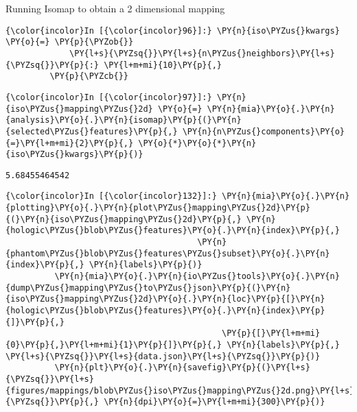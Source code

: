 Running Isomap to obtain a 2 dimensional mapping

    \begin{Verbatim}[commandchars=\\\{\}]
{\color{incolor}In [{\color{incolor}96}]:} \PY{n}{iso\PYZus{}kwargs} \PY{o}{=} \PY{p}{\PYZob{}}
             \PY{l+s}{\PYZsq{}}\PY{l+s}{n\PYZus{}neighbors}\PY{l+s}{\PYZsq{}}\PY{p}{:} \PY{l+m+mi}{10}\PY{p}{,}
         \PY{p}{\PYZcb{}}
\end{Verbatim}

    \begin{Verbatim}[commandchars=\\\{\}]
{\color{incolor}In [{\color{incolor}97}]:} \PY{n}{iso\PYZus{}mapping\PYZus{}2d} \PY{o}{=} \PY{n}{mia}\PY{o}{.}\PY{n}{analysis}\PY{o}{.}\PY{n}{isomap}\PY{p}{(}\PY{n}{selected\PYZus{}features}\PY{p}{,} \PY{n}{n\PYZus{}components}\PY{o}{=}\PY{l+m+mi}{2}\PY{p}{,} \PY{o}{*}\PY{o}{*}\PY{n}{iso\PYZus{}kwargs}\PY{p}{)}
\end{Verbatim}

    \begin{Verbatim}[commandchars=\\\{\}]
5.68455464542
    \end{Verbatim}

    \begin{Verbatim}[commandchars=\\\{\}]
{\color{incolor}In [{\color{incolor}132}]:} \PY{n}{mia}\PY{o}{.}\PY{n}{plotting}\PY{o}{.}\PY{n}{plot\PYZus{}mapping\PYZus{}2d}\PY{p}{(}\PY{n}{iso\PYZus{}mapping\PYZus{}2d}\PY{p}{,} \PY{n}{hologic\PYZus{}blob\PYZus{}features}\PY{o}{.}\PY{n}{index}\PY{p}{,}
                                       \PY{n}{phantom\PYZus{}blob\PYZus{}features\PYZus{}subset}\PY{o}{.}\PY{n}{index}\PY{p}{,} \PY{n}{labels}\PY{p}{)}
          \PY{n}{mia}\PY{o}{.}\PY{n}{io\PYZus{}tools}\PY{o}{.}\PY{n}{dump\PYZus{}mapping\PYZus{}to\PYZus{}json}\PY{p}{(}\PY{n}{iso\PYZus{}mapping\PYZus{}2d}\PY{o}{.}\PY{n}{loc}\PY{p}{[}\PY{n}{hologic\PYZus{}blob\PYZus{}features}\PY{o}{.}\PY{n}{index}\PY{p}{]}\PY{p}{,}
                                            \PY{p}{[}\PY{l+m+mi}{0}\PY{p}{,}\PY{l+m+mi}{1}\PY{p}{]}\PY{p}{,} \PY{n}{labels}\PY{p}{,} \PY{l+s}{\PYZsq{}}\PY{l+s}{data.json}\PY{l+s}{\PYZsq{}}\PY{p}{)}
          \PY{n}{plt}\PY{o}{.}\PY{n}{savefig}\PY{p}{(}\PY{l+s}{\PYZsq{}}\PY{l+s}{figures/mappings/blob\PYZus{}iso\PYZus{}mapping\PYZus{}2d.png}\PY{l+s}{\PYZsq{}}\PY{p}{,} \PY{n}{dpi}\PY{o}{=}\PY{l+m+mi}{300}\PY{p}{)}
\end{Verbatim}

